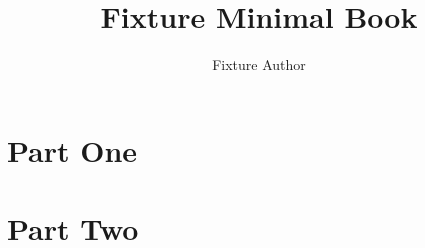 \documentclass{book}
\title{Fixture Minimal Book}
\author{Fixture Author}
\begin{document}
\part{Part One}

\part{Part Two}

\end{document}
